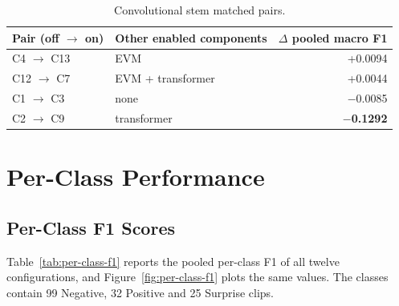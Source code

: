 \begin{table}[htbp]
	\centering
	\begin{tabular}{l l r}
		\hline
		\textbf{Pair (off $\rightarrow$ on)} & \textbf{Other enabled components} & \textbf{$\Delta$ pooled macro F1} \\
		\hline
		C4 $\rightarrow$ C13 & EVM               & +0.0094 \\
		C12 $\rightarrow$ C7 & EVM + transformer & +0.0044 \\
		C1 $\rightarrow$ C3  & none              & $-$0.0085 \\
		C2 $\rightarrow$ C9  & transformer       & \textbf{$-$0.1292} \\
		\hline
	\end{tabular}
	\caption[Convolutional stem matched pairs]{Convolutional stem matched pairs.}
	\label{tab:cnn-pairs-result}
\end{table}

\section{Per-Class Performance}
\label{sec:per-class}

\subsection{Per-Class F1 Scores}
\label{sec:per-class-table}

Table~\ref{tab:per-class-f1} reports the pooled per-class F1 of all twelve configurations, and Figure~\ref{fig:per-class-f1} plots the same values. The classes contain 99 Negative, 32 Positive and 25 Surprise clips.

